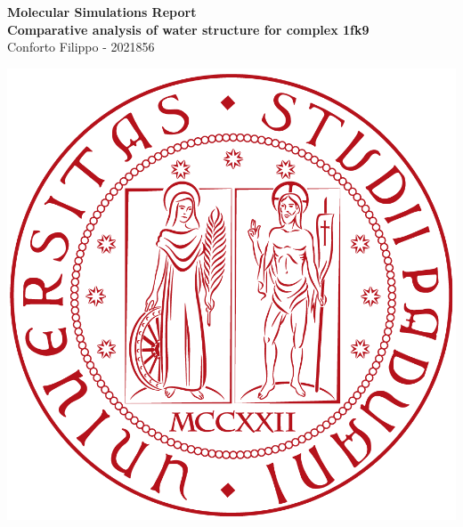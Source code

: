 \documentclass[12pt]{article}
\begin{document}

\begin{titlepage}
    \begin{flushright}
        \LARGE{\textbf{Molecular Simulations Report}}\\
        \vfill
        \Huge{\textbf{Comparative analysis of water structure for
                complex 1fk9}}\\
        \vfill
        \large Conforto Filippo - 2021856\\

        \vfill


        \includegraphics[width=0.3\linewidth]{logo.png}\\


    \end{flushright}
\end{titlepage}

\begin{center}
    \tableofcontents
    \listoffigures
\end{center}
\pagebreak
\end{document}
